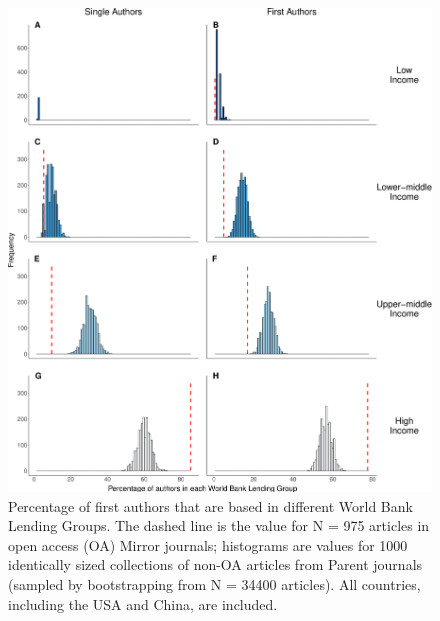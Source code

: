 \documentclass[
  english,
  man]{apa6}
\begin{document}
\begin{figure}

{\centering \includegraphics{Smith_etal_APC_ms_files/figure-latex/Fig5-1} 

}

\caption{Percentage of first authors that are based in different World Bank Lending Groups. The dashed line is the value for N =  975  articles in open access (OA) Mirror journals; histograms are values for 1000 identically sized collections of non-OA articles from Parent journals (sampled by bootstrapping from N =  34400  articles). All countries, including the USA and China, are included.}\label{fig:Fig5}
\end{figure}
\end{document}
